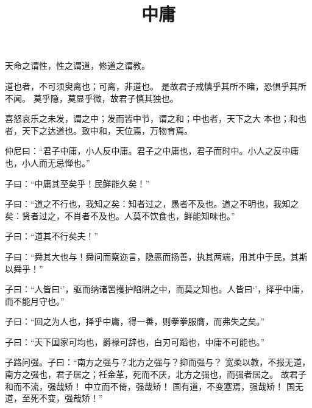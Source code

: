 \documentclass[twoside,openany]{book}
\title{中庸}
\author{\xpinyin*{孔伋}}
\date{}
\begin{document}
\maketitle
	
\noindent
	
	
\begin{pinyinscope}
天命之谓性，性之谓道，修道之谓教。

道也者，不可须臾离也；可离，非道也。
是故君子戒慎乎其所不睹，恐惧乎其所不闻。
莫乎隐，莫显乎微，故君子慎其独也。

喜怒哀乐之未发，谓之中；发而皆中节，谓之和；中也者，天下之大
本也；和也者，天下之达道也。致中和，天位焉，万物育焉。

仲尼曰：“君子中庸，小人反中庸。君子之中庸也，君子而时中。小人之反中庸也，小人而无忌惮也。”

子曰：“中庸其至矣乎！民鲜能久矣！”

子曰：“道之不行也，我知之矣：知者过之，愚者不及也。道之不明也，我知之矣：贤者过之，不肖者不及也。人莫不饮食也，鲜能知味也。”

子曰：“道其不行矣夫！”

子曰：“舜其大也与！舜问而察迩言，隐恶而扬善，执其两端，用其中于民，其斯以舜乎！”

子曰：“人皆曰‘’，驱而纳诸罟擭护陷阱之中，而莫之知也。人皆曰‘’，择乎中庸，而不能月守也。”

子曰：“回之为人也，择乎中庸，得一善，则拳拳服膺，而弗失之矣。”

子曰：“天下国家可均也，爵禄可辞也，白刃可蹈也，中庸不可能也。”

子路问强。子曰：“南方之强与？北方之强与？抑而强与？
宽柔以教，不报无道，南方之强也，君子居之；衽金革，死而不厌，北方之强也，而强者居之。
故君子和而不流，强哉矫！
中立而不倚，强哉矫！
国有道，不变塞焉，强哉矫！
国无道，至死不变，强哉矫！”


\end{pinyinscope}
\end{document}
